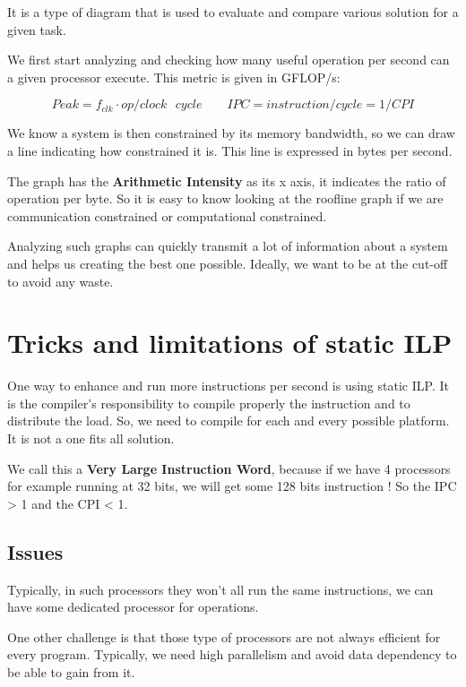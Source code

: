 \documentclass{report}
\begin{document}
It is a type of diagram that is used to evaluate and compare various solution for a given task.

We first start analyzing and checking how many useful operation per second can a given processor execute. This metric is given in GFLOP/s:

\begin{equation}
    Peak= f_{clk} \cdot op/clock \text{ } cycle \qquad IPC = instruction/cycle = 1/CPI
\end{equation}

We know a system is then constrained by its memory bandwidth, so we can draw a line indicating how constrained it is. This line is expressed in bytes per second.

The graph has the \textbf{Arithmetic Intensity} as its x axis, it indicates the ratio of operation per byte. So it is easy to know looking at the roofline graph if we are communication constrained or computational constrained.

Analyzing such graphs can quickly transmit a lot of information about a system and helps us creating the best one possible. Ideally, we want to be at the cut-off to avoid any waste.

\section{Tricks and limitations of static ILP}

One way to enhance and run more instructions per second is using static ILP. It is the compiler's responsibility to compile properly the instruction and to distribute the load. So, we need to compile for each and every possible platform. It is not a one fits all solution.

We call this a \textbf{Very Large Instruction Word}, because if we have 4 processors for example running at 32 bits, we will get some 128 bits instruction ! So the IPC > 1 and the CPI < 1.

\subsection{Issues}

Typically, in such processors they won't all run the same instructions, we can have some dedicated processor for operations.

One other challenge is that those type of processors are not always efficient for every program. Typically, we need high parallelism and avoid data dependency to be able to gain from it.
\end{document}
